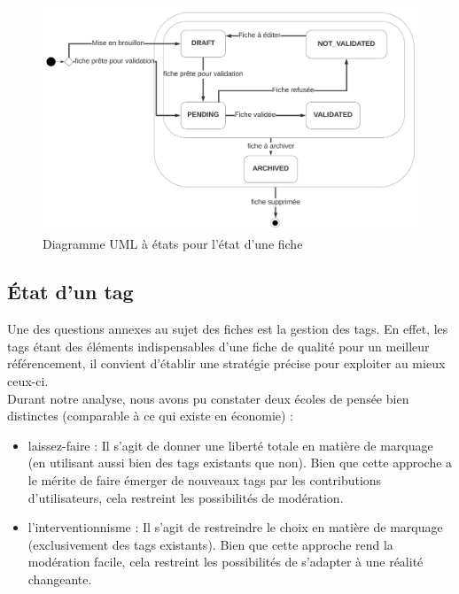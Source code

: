 \begin{figure}[H]
    \includegraphics[width=\textwidth,height=\textheight,keepaspectratio]{images/StateFiches.png}
    \centering
    \caption{Diagramme UML à états pour l'état d'une \gls{fiche}}
    \label{pic:stateDiagramForFiches}
\end{figure}

\subsection*{État d'un \gls{tag}}

Une des questions annexes au sujet des \glspl{fiche} est la gestion des \glspl{tag}. En effet, les \glspl{tag} étant des éléments indispensables d'une \gls{fiche} de qualité pour un meilleur référencement, il convient d'établir une stratégie précise pour exploiter au mieux ceux-ci. \\

Durant notre analyse, nous avons pu constater deux écoles de pensée bien distinctes (comparable à ce qui existe en économie) : 
\begin{itemize}
    \item laissez-faire : Il s'agit de donner une liberté totale en matière de marquage (en utilisant aussi bien des \glspl{tag} existants que non). Bien que cette approche a le mérite de faire émerger de nouveaux \glspl{tag} par les contributions d'utilisateurs, cela restreint les possibilités de modération.
    \item l'interventionnisme : Il s'agit de restreindre le choix en matière de marquage (exclusivement des \glspl{tag} existants). Bien que cette approche rend la modération facile, cela restreint les possibilités de s'adapter à une réalité changeante.
\end{itemize}

